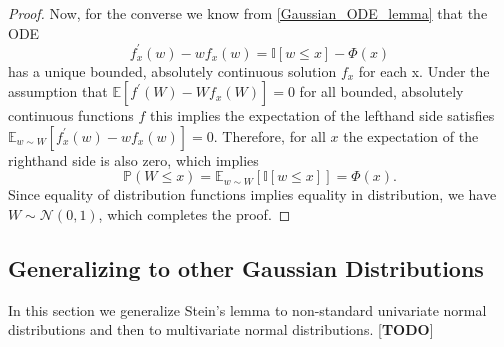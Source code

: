 \documentclass[12pt]{article}
\newcommand{\indicator}[1]{\mathbb{I}[#1]}
\newcommand{\E}{\mathbb{E}}
\newcommand{\Prob}{\mathbb{P}}
\newcommand{\Gaussian}{\mathcal{N}}
\newcommand{\GaussianCDF}{\Phi}
\begin{document}
\begin{proof}
Now, for the converse we know from \ref{Gaussian_ODE_lemma} that the ODE 
\[
f_x^\prime(w) - wf_x(w) = \indicator{w \leq x} - \GaussianCDF(x)
\]
has a unique bounded, absolutely continuous solution $f_x$ for each x. Under the assumption that $\E\left[f^\prime(W) - Wf_x(W)\right] = 0$ for all bounded, absolutely 
continuous functions $f$ this implies the expectation of the lefthand side satisfies $\E_{w \sim W} \left[f_x^\prime(w) - wf_x(w)\right] = 0$. Therefore, for all $x$ the expectation 
of the righthand side is also zero, which implies 
\[\Prob(W \leq x) = \E_{w \sim W}\left[\indicator{w \leq x}\right] = \GaussianCDF(x).\]
Since equality of distribution functions implies equality in distribution, we have $W \sim \Gaussian(0,1)$, which completes the proof. 
\end{proof} 

\subsection{Generalizing to other Gaussian Distributions}
In this section we generalize Stein's lemma to non-standard univariate normal distributions and then to multivariate normal distributions. [\textbf{TODO}]

\end{document}
